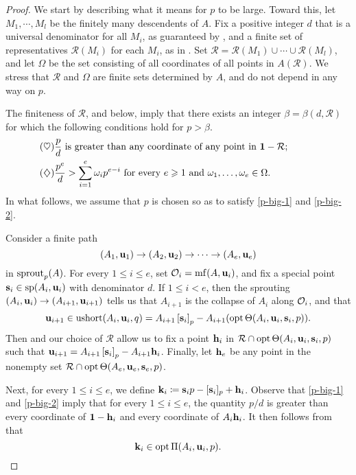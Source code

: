 \documentclass[11pt]{amsart}
\newcommand{\ushort}{\operatorname{ushort}}
\newcommand{\denom}{d}
\newcommand{\fsr}{\mathcal{R}}
\begin{document}
\begin{proof}
   We start by describing what it means for $p$ to be large.
   Toward this, let $M_1, \cdots, M_l$ be the finitely many descendents of  $A$.
   Fix a positive integer $\denom$ that is a universal denominator for all $M_i$, as guaranteed by , and a finite set of representatives $\fsr(M_i)$ for each $M_i$, as in .
   Set $\fsr = \fsr(M_1) \cup \cdots \cup \fsr(M_l)$, and let $\Omega$ be the set consisting of all coordinates of all points in $A(\fsr)$.
   We stress that $\fsr$ and $\Omega$ are finite sets determined by $A$, and do not depend in any way on $p$.

   The finiteness of $\fsr$,  and  below,
   imply that there exists an integer $\beta = \beta(\denom, \fsr)$ for which the following conditions hold for $p > \beta$. 
    \begin{align}
      \tag{$\heartsuit$} \label{p-big-1}
      &\text{$\frac{p}{\denom}$ is greater than any coordinate of any point in $\vv{1} - \fsr$;}\qquad\qquad\quad \\
      \tag{$\diamondsuit$} \label{p-big-2}
      &\text{$\frac{p^e}{\denom} > \sum_{i=1}^e \omega_i p^{e-i}$ for every $e \geq 1$ and $\omega_1, \ldots, \omega_e \in \Omega$.}
    \end{align}
    In what follows, we assume that $p$ is chosen so as to satisfy \eqref{p-big-1} and \eqref{p-big-2}. 

    Consider a finite path
    \[ (A_1, \mathbf{u}_1) \to (A_2, \mathbf{u}_2) \to \cdots \to (A_e, \mathbf{u}_e) \]
    in $\operatorname{sprout}_p(A)$.
    For every $1 \leq i \leq e$, set $\mathcal{O}_i = \operatorname{mf}(A, \mathbf{u}_i)$, and fix a special point $\mathbf{s}_i \in \operatorname{sp}(A_i, \mathbf{u}_i)$ with denominator $\denom$.
    If $1 \leq i < e$, then the sprouting $(A_i, \mathbf{u}_i) \to (A_{i+1}, \mathbf{u}_{i+1})$ tells us that $A_{i+1}$ is the collapse of $A_i$ along $\mathcal{O}_i$, and that
    \[
       \vv{u}_{i+1} \in \ushort(A_i, \vv{u}_i, q)= A_{i+1} \tail{\vv{s}_i}_p - A_{i+1}(\opt \ip( A_i, \vv{u}_i, \vv{s}_i, p)).
    \]
    Then  and our choice of $\fsr$ allow us to fix a point $\mathbf{h}_i$ in $\fsr \cap \opt \ip ( A_i, \vv{u}_i, \vv{s}_i, p)$ such that $\mathbf{u}_{i+1} = A_{i+1} \left[ \mathbf{s}_i \right]_p - A_{i+1} \mathbf{h}_i$.
    Finally, let $\mathbf{h}_e$ be any point in the nonempty set $\fsr \cap \opt \ip ( A_e, \vv{u}_e, \vv{s}_e, p)$.

    Next, for every $1 \leq i \leq e$,  we define $\mathbf{k}_i \coloneqq \mathbf{s}_i p - [\mathbf{s}_i]_p + \mathbf{h}_i$.
    Observe that \eqref{p-big-1} and \eqref{p-big-2} imply that for every $1 \leq i \leq e$, the quantity $p/\denom$ is greater than every coordinate of $\mathbf{1}-\mathbf{h}_i$ and every coordinate of $A_i \mathbf{h}_i$.
    It then follows from  that
    \begin{equation}
       \label{optimality-for-each-component: e}
       \mathbf{k}_i \in \operatorname{opt} \Pi(A_i, \mathbf{u}_i,p).
    \end{equation}


\end{proof}
\end{document}
